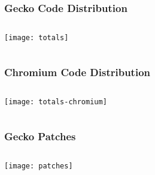 \documentclass[
	notes=none,
	aspectratio=169
]{beamer}
\begin{document}

\begin{frame}
\frametitle{Gecko Code Distribution}

\begin{columns}[T]
\begin{column}[T]{0.7\textwidth}

\vspace{0.5cm}
\texttt{[image: totals]}

\end{column}
\end{columns}

\end{frame}
\note{
}


\begin{frame}
\frametitle{Chromium Code Distribution}

\begin{columns}[T]
\begin{column}[T]{0.7\textwidth}

\vspace{0.5cm}
\texttt{[image: totals-chromium]}

\end{column}
\end{columns}

\end{frame}
\note{
}


\begin{frame}
\frametitle{Gecko Patches}

\begin{columns}[T]
\begin{column}[T]{0.7\textwidth}

\vspace{0.5cm}
\texttt{[image: patches]}

\end{column}
\end{columns}

\end{frame}
\note{
}

\end{document}
